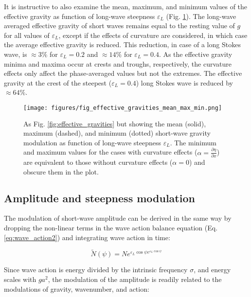 \documentclass[lineno]{jfm}
\begin{document}
It is instructive to also examine the mean, maximum, and minimum values of the
effective gravity as function of long-wave steepness $\varepsilon_L$
(Fig. \ref{fig:effective_gravities_mean_max_min}).
The long-wave averaged effective gravity of short waves remains equal to the
resting value of $g$ for all values of $\varepsilon_L$, except if the effects
of curvature are considered, in which case the average effective gravity is
reduced.
This reduction, in case of a long Stokes wave, is $\approx 3\%$ for
$\varepsilon_L = 0.2$ and $\approx 14\%$ for $\varepsilon_L = 0.4$.
As the effective gravity minima and maxima occur at crests and troughs,
respectively, the curvature effects only affect the phase-averaged values but
not the extremes.
The effective gravity at the crest of the steepest ($\varepsilon_L = 0.4$) long
Stokes wave is reduced by $\approx 64\%$.

\begin{figure}
\centering
\texttt{[image: figures/fig\_effective\_gravities\_mean\_max\_min.png]}
\caption{
  As Fig. \ref{fig:effective_gravities} but showing the mean (solid),
  maximum (dashed), and minimum (dotted) short-wave gravity modulation as
  function of long-wave steepness $\varepsilon_L$.
  The minimum and maximum values for the cases with curvature effects
  ($\alpha=\frac{\partial \eta}{\partial x}$) are equivalent to those without
  curvature effects ($\alpha=0$) and obscure them in the plot.
}
\label{fig:effective_gravities_mean_max_min}
\end{figure}

\subsection{Amplitude and steepness modulation}
\label{subsection:amplitude_modulation}

The modulation of short-wave amplitude can be derived in the same way by
dropping the non-linear terms in the wave action balance equation
(Eq. \ref{eq:wave_action2}) and integrating wave action in time:

\begin{equation}
\label{eq:wave_action_modulation}
\widetilde{N}(\psi) = N e^{\varepsilon_L \cos{\psi} e^{\varepsilon_L \cos{\psi}}}
\end{equation}

Since wave action is energy divided by the intrinsic frequency $\sigma$,
and energy scales with $ga^2$, the modulation of the amplitude is readily
related to the modulations of gravity, wavenumber, and action:
\end{document}

